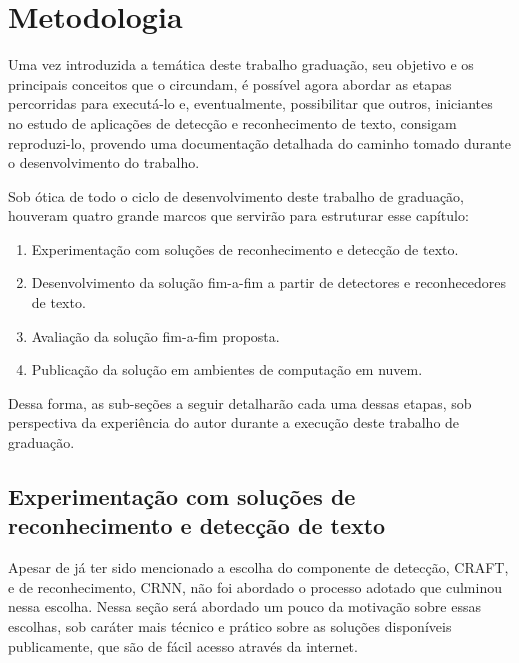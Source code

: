 \chapter{Metodologia}\label{cap:metodologia}

Uma vez introduzida a temática deste trabalho graduação, seu objetivo e os principais conceitos que o circundam, é possível agora abordar as etapas percorridas para executá-lo e, eventualmente, possibilitar que outros, iniciantes no estudo de aplicações de detecção e reconhecimento de texto, consigam reproduzi-lo, provendo uma documentação detalhada do caminho tomado durante o desenvolvimento do trabalho.

Sob ótica de todo o ciclo de desenvolvimento deste trabalho de graduação, houveram quatro grande marcos que servirão para estruturar esse capítulo:

\begin{enumerate}
    \item Experimentação com soluções de reconhecimento e detecção de texto.
    \item Desenvolvimento da solução fim-a-fim a partir de detectores e reconhecedores de texto.
    \item Avaliação da solução fim-a-fim proposta.
    \item Publicação da solução em ambientes de computação em nuvem.
\end{enumerate}


Dessa forma, as sub-seções a seguir detalharão cada uma dessas etapas, sob perspectiva da experiência do autor durante a execução deste trabalho de graduação.

\section{Experimentação com soluções de reconhecimento e detecção de texto}\label{sec:metodologia_experimentacao}

Apesar de já ter sido mencionado a escolha do componente de detecção, CRAFT, e de reconhecimento, CRNN, não foi abordado o processo adotado que culminou nessa escolha. Nessa seção será abordado um pouco da motivação sobre essas escolhas, sob caráter mais técnico e prático sobre as soluções disponíveis publicamente, que são de fácil acesso através da internet. 

